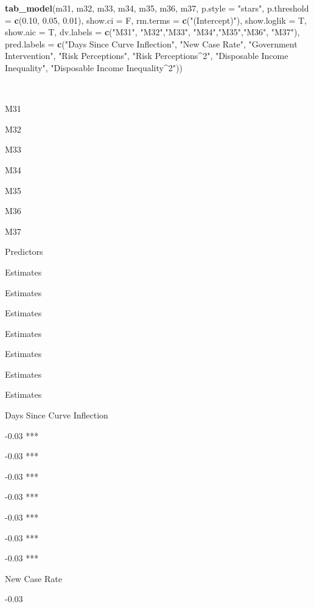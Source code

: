 \documentclass[
]{article}
\newenvironment{Shaded}{\begin{snugshade}}{\end{snugshade}}
\newcommand{\DataTypeTok}[1]{\textcolor[rgb]{0.13,0.29,0.53}{#1}}
\newcommand{\FloatTok}[1]{\textcolor[rgb]{0.00,0.00,0.81}{#1}}
\newcommand{\KeywordTok}[1]{\textcolor[rgb]{0.13,0.29,0.53}{\textbf{#1}}}
\newcommand{\NormalTok}[1]{#1}
\newcommand{\StringTok}[1]{\textcolor[rgb]{0.31,0.60,0.02}{#1}}
\begin{document}
\begin{Shaded}
\begin{Highlighting}[]
\KeywordTok{tab_model}\NormalTok{(m31, m32, m33, m34, m35, m36, m37, }\DataTypeTok{p.style =} \StringTok{"stars"}\NormalTok{, }\DataTypeTok{p.threshold =} \KeywordTok{c}\NormalTok{(}\FloatTok{0.10}\NormalTok{, }\FloatTok{0.05}\NormalTok{, }\FloatTok{0.01}\NormalTok{), }\DataTypeTok{show.ci =}\NormalTok{ F, }\DataTypeTok{rm.terms =} \KeywordTok{c}\NormalTok{(}\StringTok{"(Intercept)"}\NormalTok{), }\DataTypeTok{show.loglik =}\NormalTok{ T, }\DataTypeTok{show.aic =}\NormalTok{ T, }\DataTypeTok{dv.labels =} \KeywordTok{c}\NormalTok{(}\StringTok{"M31"}\NormalTok{, }\StringTok{"M32"}\NormalTok{,}\StringTok{"M33"}\NormalTok{, }\StringTok{"M34"}\NormalTok{,}\StringTok{"M35"}\NormalTok{,}\StringTok{"M36"}\NormalTok{, }\StringTok{"M37"}\NormalTok{), }\DataTypeTok{pred.labels =} \KeywordTok{c}\NormalTok{(}\StringTok{"Days Since Curve Inflection"}\NormalTok{, }\StringTok{"New Case Rate"}\NormalTok{, }\StringTok{"Government Intervention"}\NormalTok{, }\StringTok{"Risk Perceptions"}\NormalTok{, }\StringTok{"Risk Perceptions^2"}\NormalTok{, }\StringTok{"Disposable Income Inequality"}\NormalTok{, }\StringTok{"Disposable Income Inequality^2"}\NormalTok{))}
\end{Highlighting}
\end{Shaded}

~

M31

M32

M33

M34

M35

M36

M37

Predictors

Estimates

Estimates

Estimates

Estimates

Estimates

Estimates

Estimates

Days Since Curve Inflection

-0.03 ***

-0.03 ***

-0.03 ***

-0.03 ***

-0.03 ***

-0.03 ***

-0.03 ***

New Case Rate

-0.03
\end{document}
